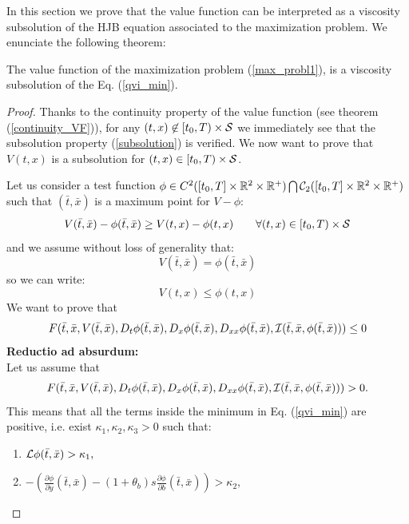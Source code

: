 In this section we prove that the value function can be interpreted as a viscosity subsolution of the HJB equation associated to the maximization problem. 
We enunciate the following theorem:
\begin{Theorem}\label{subsolution_th}
 The value function of the maximization problem (\ref{max_probl1}), is a viscosity subsolution of the Eq. (\ref{qvi_min}).
\end{Theorem}
\begin{proof}
Thanks to the continuity property of the value function (see theorem (\ref{continuity_VF})), for any $(t, x) \not \in [t_0,T) \times \mathcal{S}$ we immediately see that 
the subsolution property (\ref{subsolution}) is verified.
We now want to prove that $V(t, x)$ is a subsolution for $(t, x) \in [t_0,T) \times \mathcal{S}$.

Let us consider a test function $ \phi \in C^2([t_0,T] \times \mathbb{R}^2\times \mathbb{R}^+) \bigcap \mathcal{C}_2([t_0,T] \times \mathbb{R}^2\times \mathbb{R}^+)$ such that 
$(\bar t,\bar x)$ is a maximum point for $V-\phi$:
\begin{equation}
 V(\bar t,\bar x) - \phi(\bar t,\bar x) \geq V(t,x) - \phi(t, x) \hspace{2em} \forall (t,x) \in [t_0,T) \times \mathcal{S}
\end{equation}
and we assume without loss of generality that:
\begin{equation}\label{max_point}
V(\bar t,\bar x) = \phi(\bar t,\bar x)  
\end{equation}
so we can write:
\begin{equation}\label{max_point2}
V(t,x) \leq \phi(t, x) 
\end{equation}
We want to prove that
$$ F(\bar t,\bar x,V(\bar t, \bar x),D_t \phi(\bar t, \bar x),D_x \phi(\bar t, \bar x),D_{xx}\phi(\bar t, \bar x),
\mathcal{I}(\bar t, \bar x,\phi(\bar t, \bar x))) \leq 0  $$
\textbf{Reductio ad absurdum:}\\
Let us assume that 
$$F(\bar t,\bar x,V(\bar t, \bar x),D_t \phi(\bar t, \bar x),D_x \phi(\bar t, \bar x),D_{xx}\phi(\bar t, \bar x),
\mathcal{I}(\bar t,\bar x,\phi(\bar t, \bar x))) >0.$$ 
This means that all the terms inside the minimum in Eq. (\ref{qvi_min}) are positive, i.e. exist $\kappa_1, \kappa_2, \kappa_3 >0$ such that:
\begin{enumerate}
 \item $ \mathcal{L} \phi(\bar t, \bar x) > \kappa_1 ,$
 \item $-\left(\frac{\partial \phi}{\partial y}(\bar t, \bar x)
 -(1+\theta_b)s \frac{\partial \phi}{\partial b}(\bar t, \bar x)\right) > \kappa_2,$

\end{enumerate}
\end{proof}
